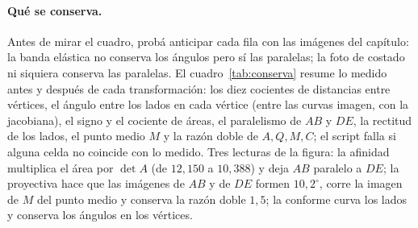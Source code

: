 \paragraph{Qué se conserva.} Antes de mirar el cuadro, probá anticipar cada fila con las
imágenes del capítulo: la banda elástica no conserva los ángulos pero sí las paralelas; la foto
de costado ni siquiera conserva las paralelas. El cuadro~\ref{tab:conserva} resume lo medido antes y después de
cada transformación: los diez cocientes de distancias entre vértices, el ángulo entre los
lados en cada vértice (entre las curvas imagen, con la jacobiana), el signo y el cociente de
áreas, el paralelismo de \(AB\) y \(DE\), la rectitud de los lados, el punto medio \(M\) y la
razón doble de \(A,Q,M,C\); el script falla si alguna celda no coincide con lo medido. Tres
lecturas de la figura: la afinidad multiplica el área por \(\det A\) (de \(12{,}150\) a \(10{,}388\)) y deja
\(AB\) paralelo a \(DE\); la proyectiva hace que las imágenes de \(AB\) y de \(DE\) formen
\(10{,}2^\circ\), corre la imagen de \(M\) del punto medio y conserva la razón doble
\(1{,}5\); la conforme curva los lados y conserva los ángulos en los vértices.


